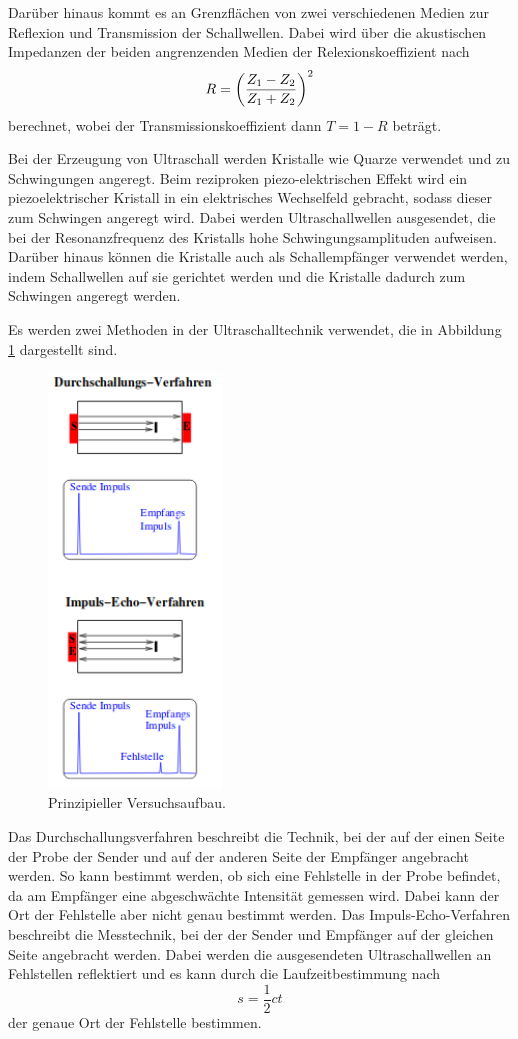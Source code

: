 Darüber hinaus kommt es an Grenzflächen von zwei verschiedenen Medien zur Reflexion und Transmission der Schallwellen.
Dabei wird über die akustischen Impedanzen der beiden angrenzenden Medien der Relexionskoeffizient nach
\begin{equation}
    R = \left(\frac{Z_1 - Z_2}{Z_1 + Z_2} \right)^2 \notag
\end{equation}
berechnet, wobei der Transmissionskoeffizient dann $T = 1- R$ beträgt.

Bei der Erzeugung von Ultraschall werden Kristalle wie Quarze verwendet und zu Schwingungen angeregt.
Beim reziproken piezo-elektrischen Effekt wird ein piezoelektrischer Kristall in ein elektrisches Wechselfeld gebracht, sodass dieser zum Schwingen angeregt wird.
Dabei werden Ultraschallwellen ausgesendet, die bei der Resonanzfrequenz des Kristalls hohe Schwingungsamplituden aufweisen.
Darüber hinaus können die Kristalle auch als Schallempfänger verwendet werden, indem Schallwellen auf sie gerichtet werden und die Kristalle dadurch zum Schwingen angeregt werden.

Es werden zwei Methoden in der Ultraschalltechnik verwendet, die in Abbildung \ref{fig:1} dargestellt sind.
\begin{figure}[h]
    \centering
    \includegraphics[height=11cm]{Theorie/Verfahren.pdf}
    \caption{Prinzipieller Versuchsaufbau. \cite{US2}}
    \label{fig:1}
\end{figure}

Das Durchschallungsverfahren beschreibt die Technik, bei der auf der einen Seite der Probe der Sender und auf der anderen Seite der Empfänger angebracht werden.
So kann bestimmt werden, ob sich eine Fehlstelle in der Probe befindet, da am Empfänger eine abgeschwächte Intensität gemessen wird.
Dabei kann der Ort der Fehlstelle aber nicht genau bestimmt werden.
Das Impuls-Echo-Verfahren beschreibt die Messtechnik, bei der der Sender und Empfänger auf der gleichen Seite angebracht werden.
Dabei werden die ausgesendeten Ultraschallwellen an Fehlstellen reflektiert und es kann durch die Laufzeitbestimmung nach 
\begin{equation}
    \label{eq:3}
    s = \frac{1}{2} c t
\end{equation}
der genaue Ort der Fehlstelle bestimmen.

